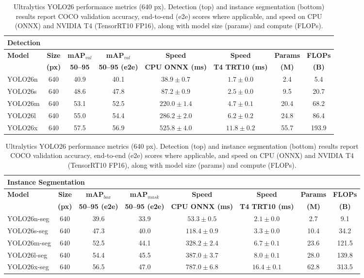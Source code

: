 \documentclass{article}
\begin{document}
\begin{table}[h!]
\centering
\scriptsize
\setlength{\tabcolsep}{4pt}
\renewcommand{\arraystretch}{1.15}
\caption{Ultralytics YOLO26 performance metrics (640 px). Detection (top) and instance segmentation (bottom) results report COCO validation accuracy, end-to-end (e2e) scores where applicable, and speed on CPU (ONNX) and NVIDIA T4 (TensorRT10 FP16), along with model size (params) and compute (FLOPs).}
\label{tab:yolo26_metrics}
\vspace{2pt}

\begin{tabular}{l c c c c c c c}
\toprule
\multicolumn{8}{l}{\textbf{Detection}} \\
\midrule
\textbf{Model} & \textbf{Size} & \textbf{mAP$_{val}$} & \textbf{mAP$_{val}$} & \textbf{Speed} & \textbf{Speed} & \textbf{Params} & \textbf{FLOPs} \\
 & \textbf{(px)} & \textbf{50--95} & \textbf{50--95 (e2e)} & \textbf{CPU ONNX (ms)} & \textbf{T4 TRT10 (ms)} & \textbf{(M)} & \textbf{(B)} \\
\midrule
YOLO26n & 640 & 40.9 & 40.1 & $38.9 \pm 0.7$ & $1.7 \pm 0.0$ & 2.4 & 5.4 \\
YOLO26s & 640 & 48.6 & 47.8 & $87.2 \pm 0.9$ & $2.5 \pm 0.0$ & 9.5 & 20.7 \\
YOLO26m & 640 & 53.1 & 52.5 & $220.0 \pm 1.4$ & $4.7 \pm 0.1$ & 20.4 & 68.2 \\
YOLO26l & 640 & 55.0 & 54.4 & $286.2 \pm 2.0$ & $6.2 \pm 0.2$ & 24.8 & 86.4 \\
YOLO26x & 640 & 57.5 & 56.9 & $525.8 \pm 4.0$ & $11.8 \pm 0.2$ & 55.7 & 193.9 \\
\bottomrule
\end{tabular}

\vspace{6pt}

\begin{tabular}{l c c c c c c c}
\toprule
\multicolumn{8}{l}{\textbf{Instance Segmentation}} \\
\midrule
\textbf{Model} & \textbf{Size} & \textbf{mAP$_{box}$} & \textbf{mAP$_{mask}$} & \textbf{Speed} & \textbf{Speed} & \textbf{Params} & \textbf{FLOPs} \\
 & \textbf{(px)} & \textbf{50--95 (e2e)} & \textbf{50--95 (e2e)} & \textbf{CPU ONNX (ms)} & \textbf{T4 TRT10 (ms)} & \textbf{(M)} & \textbf{(B)} \\
\midrule
YOLO26n-seg & 640 & 39.6 & 33.9 & $53.3 \pm 0.5$ & $2.1 \pm 0.0$ & 2.7 & 9.1 \\
YOLO26s-seg & 640 & 47.3 & 40.0 & $118.4 \pm 0.9$ & $3.3 \pm 0.0$ & 10.4 & 34.2 \\
YOLO26m-seg & 640 & 52.5 & 44.1 & $328.2 \pm 2.4$ & $6.7 \pm 0.1$ & 23.6 & 121.5 \\
YOLO26l-seg & 640 & 54.4 & 45.5 & $387.0 \pm 3.7$ & $8.0 \pm 0.1$ & 28.0 & 139.8 \\
YOLO26x-seg & 640 & 56.5 & 47.0 & $787.0 \pm 6.8$ & $16.4 \pm 0.1$ & 62.8 & 313.5 \\
\bottomrule
\end{tabular}
\end{table}
\end{document}
